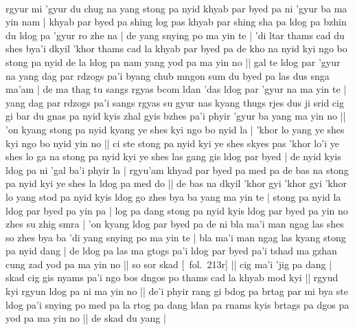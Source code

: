 \documentclass[12pt]{article}
\begin{document}
\textbf{\TVA}\\
rgyur mi 'gyur du chug na yang stong pa nyid khyab par byed pa ni 'gyur ba ma yin nam | khyab par byed pa shing log pas khyab par shing sha pa ldog pa bzhin du ldog pa 'gyur ro zhe na | de yang snying po ma yin te | 'di ltar thams cad du shes bya'i dkyil 'khor thams cad la khyab par byed pa de kho na nyid kyi ngo bo stong pa nyid de la ldog pa nam yang yod pa ma yin no || gal te ldog par 'gyur na yang dag par rdzogs pa'i byang chub mngon sum du byed pa las dus snga ma'am | de ma thag tu sangs rgyas bcom ldan 'das ldog par 'gyur na ma yin te | yang dag par rdzogs pa'i sangs rgyas su gyur nas kyang thugs rjes dus ji srid cig gi bar du gnas pa nyid kyis zhal gyis bzhes pa'i phyir 'gyur ba yang ma yin no || 'on kyang stong pa nyid kyang ye shes kyi ngo bo nyid la | 'khor lo yang ye shes kyi ngo bo nyid yin no || ci ste stong pa nyid kyi ye shes skyes pas 'khor lo'i ye shes lo ga na stong pa nyid kyi ye shes las gang gis ldog par byed | de nyid kyis ldog pa ni 'gal ba'i phyir la | rgyu'am khyad par byed pa med pa de bas na stong pa nyid kyi ye shes la ldog pa med do || de bas na dkyil 'khor gyi 'khor gyi 'khor lo yang stod pa nyid kyis ldog go zhes bya ba yang ma yin te | stong pa nyid la ldog par byed pa yin pa | log pa dang stong pa nyid kyis ldog par byed pa yin no zhes su zhig smra | 'on kyang ldog par byed pa de ni bla ma'i man ngag las shes so zhes bya ba 'di yang snying po ma yin te | bla ma'i man ngag las kyang stong pa nyid dang | de ldog pa las ma gtogs pa'i ldog par byed pa'i tshad ma gzhan cung zad yod pa ma yin no || so sor skad [\TVA\ fol.\ 213r] || cig ma'i 'jig pa dang | skad cig gis nyams pa'i ngo bos dngos po thams cad la khyab mod kyi || rgyud kyi rgyun ldog pa ni ma yin no || de'i phyir rang gi bdog pa brtag par mi bya ste ldog pa'i snying po med pa la rtog pa dang ldan pa rnams kyis brtags pa dgos pa yod pa ma yin no || de skad du yang | \\
\end{document}
